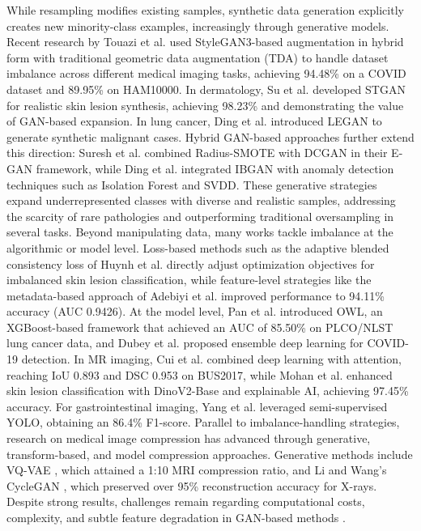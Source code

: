 \documentclass[twocolumn]{svjour3}
\begin{document}
While resampling modifies existing samples, synthetic data generation explicitly creates new minority-class examples, increasingly through generative models. Recent research by Touazi et al. \cite{ref26} used StyleGAN3-based augmentation in hybrid form with traditional geometric data augmentation (TDA) to handle dataset imbalance across different medical imaging tasks, achieving 94.48\% on a COVID dataset and 89.95\% on HAM10000. In dermatology, Su et al. \cite{ref27} developed STGAN for realistic skin lesion synthesis, achieving 98.23\% and demonstrating the value of GAN-based expansion. In lung cancer, Ding et al. \cite{ref28} introduced LEGAN to generate synthetic malignant cases. Hybrid GAN-based approaches further extend this direction: Suresh et al. \cite{ref29} combined Radius-SMOTE with DCGAN in their E-GAN framework, while Ding et al. \cite{ref30} integrated IBGAN with anomaly detection techniques such as Isolation Forest and SVDD. These generative strategies expand underrepresented classes with diverse and realistic samples, addressing the scarcity of rare pathologies and outperforming traditional oversampling in several tasks.
Beyond manipulating data, many works tackle imbalance at the algorithmic or model level. Loss-based methods such as the adaptive blended consistency loss of Huynh et al. \cite{ref31} directly adjust optimization objectives for imbalanced skin lesion classification, while feature-level strategies like the metadata-based approach of Adebiyi et al. \cite{ref32} improved performance to 94.11\% accuracy (AUC 0.9426). At the model level, Pan et al. \cite{ref33} introduced OWL, an XGBoost-based framework that achieved an AUC of 85.50\% on PLCO/NLST lung cancer data, and Dubey et al. \cite{ref34} proposed ensemble deep learning for COVID-19 detection. In MR imaging, Cui et al. \cite{ref35} combined deep learning with attention, reaching IoU 0.893 and DSC 0.953 on BUS2017, while Mohan et al. \cite{ref36} enhanced skin lesion classification with DinoV2-Base and explainable AI, achieving 97.45\% accuracy. For gastrointestinal imaging, Yang et al. \cite{ref37} leveraged semi-supervised YOLO, obtaining an 86.4\% F1-score. Parallel to imbalance-handling strategies, research on medical image compression has advanced through generative, transform-based, and model compression approaches. Generative methods include VQ-VAE \cite{ref38}, which attained a 1:10 MRI compression ratio, and Li and Wang’s CycleGAN \cite{ref39}, which preserved over 95\% reconstruction accuracy for X-rays. Despite strong results, challenges remain regarding computational costs, complexity, and subtle feature degradation in GAN-based methods \cite{ref39}.
\end{document}
